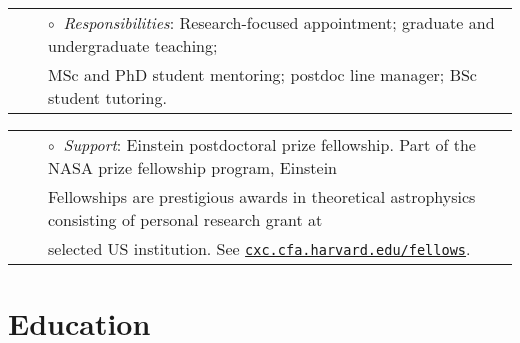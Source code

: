 

\vspace{-0.1cm}
\begin{tabular}{rcl}
&\hspace{0.4cm} &$\circ\;\;${\textit{Responsibilities}}: Research-focused appointment; graduate and undergraduate teaching; \\&\hspace{0.4cm} &  
\hspace{0.4cm}
MSc and PhD student mentoring; postdoc line manager; BSc student tutoring.\\
\end{tabular}


\vspace{0.2cm}

\vspace{-0.1cm}
\begin{tabular}{rcl}
&\hspace{0.4cm} &$\circ\;\;${\textit{Support}}: Einstein postdoctoral prize fellowship.  Part of the NASA prize fellowship program, Einstein\\
&\hspace{0.4cm} &  \hspace{0.4cm}Fellowships are prestigious awards in theoretical astrophysics consisting of personal research grant at\\
&\hspace{0.4cm} &  \hspace{0.4cm}selected US institution. See  \href{http://cxc.cfa.harvard.edu/fellows}{\texttt{cxc.cfa.harvard.edu/fellows}}.\\
\end{tabular}


\section{Education}

